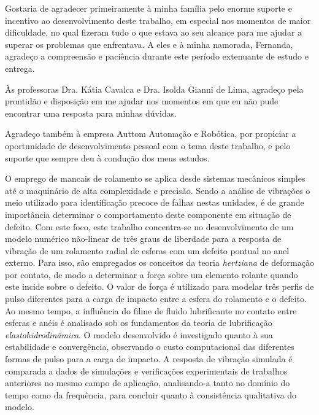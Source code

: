 \imprimircapa
\imprimirfolhaderosto
\clearpage


\begin{agradecimentos}
	Gostaria de agradecer primeiramente à minha família pelo enorme suporte e incentivo ao desenvolvimento deste trabalho, em especial nos momentos de maior dificuldade, no qual fizeram tudo o que estava ao seu alcance para me ajudar a superar os problemas que enfrentava.
	A eles e à minha namorada, Fernanda, agradeço a compreensão e paciência durante este período extenuante de estudo e entrega.
	
	Às professoras Dra. Kátia Cavalca e Dra. Isolda Gianni de Lima, agradeço pela prontidão e disposição em me ajudar nos momentos em que eu não pude encontrar uma resposta para minhas dúvidas.
	
	Agradeço também à empresa Auttom Automação e Robótica, por propiciar a oportunidade de desenvolvimento pessoal com o tema deste trabalho, e pelo suporte que sempre deu à condução dos meus estudos.
\end{agradecimentos}

\begin{resumo}
	O emprego de mancais de rolamento se aplica desde sistemas mecânicos simples até o maquinário de alta complexidade e precisão.
	Sendo a análise de vibrações o meio utilizado para identificação precoce de falhas nestas unidades, é de grande importância determinar o comportamento deste componente em situação de defeito.
	Com este foco, este trabalho concentra-se no desenvolvimento de um modelo numérico não-linear de três graus de liberdade para a resposta de vibração de um rolamento radial de esferas com um defeito pontual no anel externo.
	Para isso, são empregados os conceitos da teoria \emph{hertziana} de deformação por contato, de modo a determinar a força sobre um elemento rolante quando este incide sobre o defeito.
	O valor de força é utilizado para modelar três perfis de pulso diferentes para a carga de impacto entre a esfera do rolamento e o defeito.
	Ao mesmo tempo, a influência do filme de fluido lubrificante no contato entre esferas e anéis é analisado sob os fundamentos da teoria de lubrificação \emph{elastohidrodinâmica}.
	O modelo desenvolvido é investigado quanto à sua estabilidade e convergência, observando o custo computacional das diferentes formas de pulso para a carga de impacto.
	A resposta de vibração simulada é comparada a dados de simulações e verificações experimentais de trabalhos anteriores no mesmo campo de aplicação, analisando-a tanto no domínio do tempo como da frequência, para concluir quanto à consistência qualitativa do modelo.
\end{resumo}

